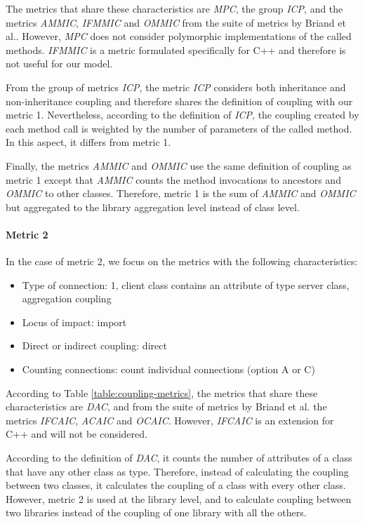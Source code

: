 The metrics that share these characteristics are \textit{MPC}, the group \textit{ICP}, and the metrics \textit{AMMIC}, \textit{IFMMIC} and \textit{OMMIC} from the suite of metrics by Briand et al.. However, \textit{MPC} does not consider polymorphic implementations of the called methods. \textit{IFMMIC} is a metric formulated specifically for C++ \cite{briand1997investigation} and therefore is not useful for our model.

From the group of metrics \textit{ICP}, the metric \textit{ICP}  considers both inheritance and non-inheritance coupling and therefore shares the definition of coupling with our metric 1. Nevertheless, according to the definition of \textit{ICP}, the coupling created by each method call is weighted by the number of parameters of the called method. In this aspect, it differs from metric 1.

Finally, the metrics \textit{AMMIC} and \textit{OMMIC} use the same definition of coupling as metric 1 except that \textit{AMMIC} counts the method invocations to ancestors and \textit{OMMIC} to other classes. Therefore, metric 1 is the sum of \textit{AMMIC} and \textit{OMMIC} but aggregated to the library aggregation level instead of class level.

\paragraph{Metric 2}
In the case of metric 2, we focus on the metrics with the following characteristics:

\begin{itemize}
  \item Type of connection: 1, client class contains an attribute of type server class, aggregation coupling
  \item Locus of impact: import
  \item Direct or indirect coupling: direct
  \item Counting connections: count individual connections (option A or C)
\end{itemize}

According to Table \ref{table:coupling-metrics}, the metrics that share these characteristics are \textit{DAC}, and from the suite of metrics by Briand et al. the metrics \textit{IFCAIC}, \textit{ACAIC} and \textit{OCAIC}. However, \textit{IFCAIC} is an extension for C++ and will not be considered.

According to the definition of \textit{DAC}, it counts the number of attributes of a class that have any other class as type. Therefore, instead of calculating the coupling between two classes, it calculates the coupling of a class with every other class. However, metric 2 is used at the library level, and to calculate coupling between two libraries instead of the coupling of one library with all the others.

